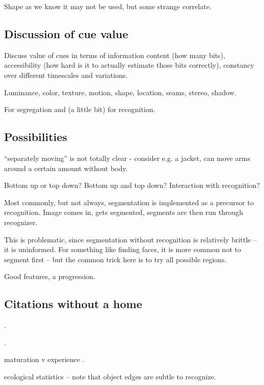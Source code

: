 Shape as we know it may not be used, but some strange 
correlate.



\subsection{Discussion of cue value}

Discuss value of cues in terms of information content (how many bits),
accessibility (how hard is it to actually estimate those bits
correctly), constancy over different timescales and variations.

Luminance, color, texture, motion, shape, location, seams, stereo,
shadow.

For segregation and (a little bit) for recognition.


\subsection{Possibilities}

``separately moving'' is not totally clear - consider e.g. a 
jacket, can move arms around a certain amount without body.

Bottom up or top down?  Bottom up and top down?  Interaction
with recognition?

Most commonly, but not always, segmentation is implemented
as a precursor to recognition.  Image comes in, gets
segmented, segments are then run through recognizer.

This is problematic, since segmentation without
recognition is relatively brittle -- it is uninformed.
For something like finding faces, it is more common
not to segment first -- but the common trick here
is to try all possible regions.

Good features, a progression.

\subsection{Citations without a home}

\cite{swain91color}.

\cite{schiele00recognition}.

\cite{lowe04distinctive}

\cite{felzenszwalb04efficient}

maturation v experience \cite{quinn05learning}.

ecological statistics \cite{martin04learning} -- note
that object edges are subtle to recognize.

